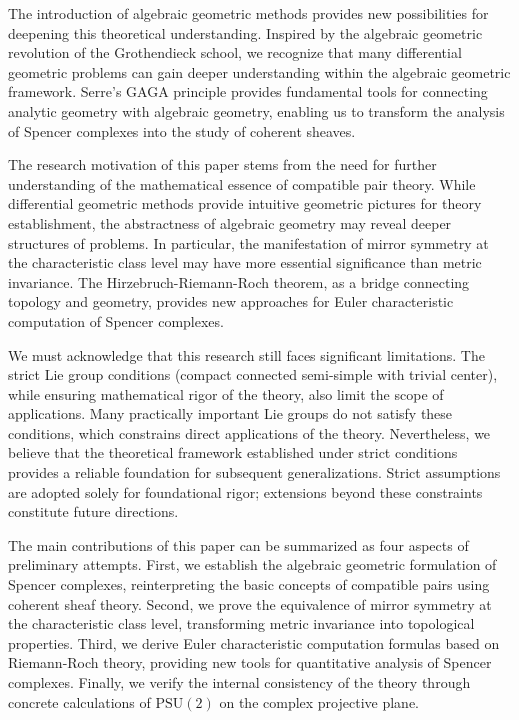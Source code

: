 \documentclass[a4paper,12pt]{extarticle}
\theoremstyle{definition}
\begin{document}
The introduction of algebraic geometric methods provides new possibilities for deepening this theoretical understanding. Inspired by the algebraic geometric revolution of the Grothendieck school\cite{grothendieck1957theoremes}, we recognize that many differential geometric problems can gain deeper understanding within the algebraic geometric framework. Serre's GAGA principle\cite{serre1956geometrie} provides fundamental tools for connecting analytic geometry with algebraic geometry, enabling us to transform the analysis of Spencer complexes into the study of coherent sheaves.

The research motivation of this paper stems from the need for further understanding of the mathematical essence of compatible pair theory. While differential geometric methods provide intuitive geometric pictures for theory establishment, the abstractness of algebraic geometry may reveal deeper structures of problems. In particular, the manifestation of mirror symmetry at the characteristic class level may have more essential significance than metric invariance. The Hirzebruch-Riemann-Roch theorem\cite{hirzebruch1966topological}, as a bridge connecting topology and geometry, provides new approaches for Euler characteristic computation of Spencer complexes.

We must acknowledge that this research still faces significant limitations. The strict Lie group conditions (compact connected semi-simple with trivial center), while ensuring mathematical rigor of the theory, also limit the scope of applications. Many practically important Lie groups do not satisfy these conditions, which constrains direct applications of the theory. Nevertheless, we believe that the theoretical framework established under strict conditions provides a reliable foundation for subsequent generalizations. Strict assumptions are adopted solely for foundational rigor; extensions beyond these constraints constitute future directions.

The main contributions of this paper can be summarized as four aspects of preliminary attempts. First, we establish the algebraic geometric formulation of Spencer complexes, reinterpreting the basic concepts of compatible pairs using coherent sheaf theory. Second, we prove the equivalence of mirror symmetry at the characteristic class level, transforming metric invariance into topological properties. Third, we derive Euler characteristic computation formulas based on Riemann-Roch theory, providing new tools for quantitative analysis of Spencer complexes. Finally, we verify the internal consistency of the theory through concrete calculations of $\text{PSU}(2)$ on the complex projective plane.
\end{document}
